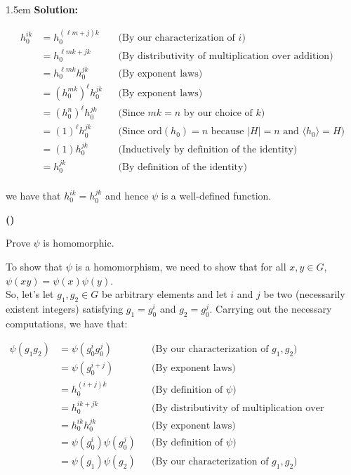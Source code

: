 \documentclass{article}
\newenvironment{solution}{
	\vspace{.5em}
	\par
	\begin{adjustwidth}{1.5em}{}
	\textbf{{Solution:}}
	\par
	\vspace{.5em}
}{
	\vspace{1em}
	\end{adjustwidth}
	\setcounter{step}{0}
	\newpage
}
\newcounter{step}
\renewcommand{\thestep}{\Roman{step}}
\newenvironment{step}{
	\refstepcounter{step}
	\vspace{1em}\par\noindent
	\ignorespaces\noindent\textbf{(\thestep)}
	\ignorespaces
}{
	\par
	\vspace{1.5em}
}
\newcommand{\ord}[1]{\text{ord}({#1})}
\newcommand{\gen}[1]{\langle {#1} \rangle}
\begin{document}
\begin{solution}
	\begin{align*}
		h_{0}^{ik} &= h_{0}^{(\ell m + j)k} &&\text{(By our characterization of $i$)} \\
		&= h_{0}^{\ell mk + jk} &&\text{(By distributivity of multiplication over addition)} \\
		&= h_{0}^{\ell mk}h_{0}^{jk} &&\text{(By exponent laws)} \\
		&= (h_{0}^{mk})^{\ell}h_{0}^{jk} &&\text{(By exponent laws)} \\
		&= (h_{0}^{n})^{\ell}h_{0}^{jk} &&\text{(Since $mk = n$ by our choice of $k$)} \\
		&= (1)^{\ell}h_{0}^{jk} &&\text{(Since $\ord{h_{0}} = n$ because $|H| = n$ and $\gen{h_{0}} = H$)} \\
		&= (1)h_{0}^{jk} &&\text{(Inductively by definition of the identity)} \\
		&= h_{0}^{jk} &&\text{(By definition of the identity)} \\
	\end{align*}

	we have that $h_{0}^{ik} = h_{0}^{jk}$ and hence $\psi$ is a well-defined function.

	\begin{step}
		Prove $\psi$ is homomorphic.
	\end{step}

	To show that $\psi$ is a homomorphism, we need to show that for all $x, y \in G$, $\psi(xy) = \psi(x)\psi(y)$. \\

	So, let's let $g_{1}, g_{2} \in G$ be arbitrary elements and let $i$ and $j$ be two (necessarily existent integers) satisfying $g_{1} = g_{0}^{i}$ and $g_{2} = g_{0}^{j}$. Carrying out the necessary computations, we have that:

	\begin{align*}
		\psi(g_{1}g_{2}) &= \psi(g_{0}^{i}g_{0}^{j}) &&\text{(By our characterization of $g_{1}, g_{2}$)} \\
		&= \psi(g_{0}^{i+j}) &&\text{(By exponent laws)} \\
		&= h_{0}^{(i+j)k} &&\text{(By definition of $\psi$)} \\
		&= h_{0}^{ik + jk} &&\text{(By distributivity of multiplication over addition)} \\
		&= h_{0}^{ik}h_{0}^{jk} &&\text{(By exponent laws)} \\
		&= \psi(g_{0}^{i})\psi(g_{0}^{j}) &&\text{(By definition of $\psi$)} \\
		&= \psi(g_{1})\psi(g_{2}) &&\text{(By our characterization of $g_{1}, g_{2}$)} \\
	\end{align*}


\end{solution}
\end{document}
